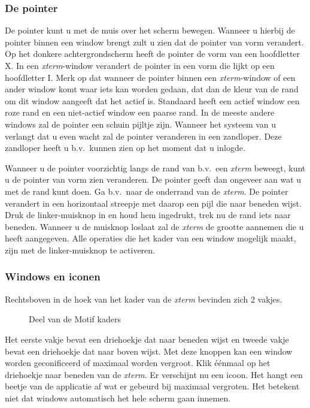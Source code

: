\subsubsection{De pointer}
\label{De pointer}

De pointer kunt u met de muis over het scherm bewegen.
Wanneer u hierbij de pointer binnen een window brengt zult u zien dat
de pointer van vorm verandert.
Op het donkere achtergrondscherm heeft de pointer de vorm van een hoofdletter X.
In een {\em xterm}-window verandert de pointer in een vorm die lijkt op 
een hoofdletter I.
Merk op dat wanneer de pointer binnen een {\em xterm}-window of een ander
window komt waar iets kan worden gedaan, dat dan de kleur van de rand
om dit window aangeeft dat het actief is.
Standaard heeft een actief
window een roze rand en een niet-actief window een paarse rand.
In de meeste andere windows zal de pointer een schuin pijltje zijn.
Wanneer het systeem van u verlangt dat u even wacht zal de pointer veranderen
in een zandloper.
Deze zandloper heeft u b.v.\ kunnen zien op het moment dat u inlogde.

Wanneer u de pointer voorzichtig langs de rand van b.v.\ een {\em xterm}
beweegt, kunt u de pointer  van vorm zien veranderen.
De pointer geeft dan ongeveer aan wat u met de rand kunt doen.
Ga b.v.\ naar de onderrand van de {\em xterm}. De pointer
verandert in een horizontaal streepje met daarop een pijl die naar
beneden wijst. Druk de linker-muisknop in en houd hem ingedrukt,
trek nu de rand iets naar beneden. Wanneer u de muisknop loslaat zal
de {\em xterm} de grootte aannemen die u heeft aangegeven.
Alle operaties die het kader van een window mogelijk maakt,
zijn met de linker-muisknop te activeren.

\subsubsection{Windows en iconen} 
\label{Windows en iconen}

Rechtsboven in de hoek van het kader van de {\em xterm} bevinden 
zich 2 vakjes.
\begin{figure}[bth]
\centerline{}
\caption{Deel van de Motif kaders
\label{kader_rb}}
\end{figure}
Het eerste vakje bevat een driehoekje dat naar beneden wijst en
tweede vakje bevat een driehoekje dat naar boven wijst.
Met deze knoppen kan een
window worden ge{\ii}conificeerd of maximaal worden vergroot.
Klik \'e\'enmaal op het driehoekje naar beneden van de {\em xterm}.
Er verschijnt nu een icoon.
Het hangt een beetje van de applicatie af wat er gebeurd bij maximaal vergroten.
Het betekent niet dat windows automatisch het hele scherm gaan innemen.

